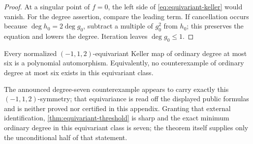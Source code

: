 \begin{proof}
At a singular point of \(f=0\), the left side of
\eqref{eq:equivariant-keller} would vanish.  For the degree assertion,
compare the leading term.  If cancellation occurs because
\(\deg h_0=2\deg g_0\), subtract a multiple of \(g_0^2\) from \(h_0\);
this preserves the equation and lowers the degree.  Iteration leaves
\(\deg g_0\le1\).
\end{proof}

\begin{theorem}
\label{thm:equivariant-threshold}
Every normalized \((-1,1,2)\)-equivariant Keller map of ordinary degree at
most six is a polynomial automorphism.  Equivalently, no counterexample of
ordinary degree at most six exists in this equivariant class.
\end{theorem}

\begin{remark}
\label{rem:equivariant-sharpness}
The announced degree-seven counterexample \cite{alpoge2026announcement}
appears to carry exactly this \((-1,1,2)\)-symmetry; that equivariance is
read off the displayed public formulas and is neither proved nor certified
in this appendix.  Granting that external identification,
\cref{thm:equivariant-threshold} is sharp and the exact minimum ordinary
degree in this equivariant class is seven; the theorem itself supplies
only the unconditional half of that statement.
\end{remark}

